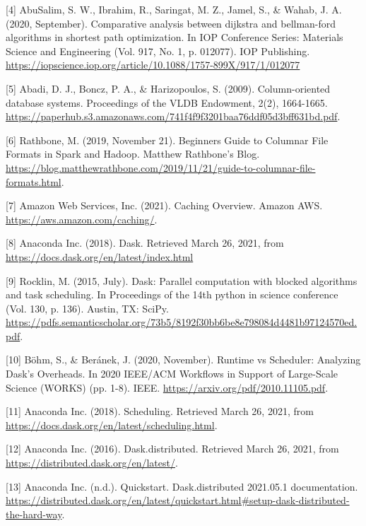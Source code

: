 \documentclass[11pt, oneside]{book}
\begin{document}
\begin{thebibliography}{111}
[4] AbuSalim, S. W., Ibrahim, R., Saringat, M. Z., Jamel, S., \& Wahab, J. A. (2020, September). Comparative analysis between dijkstra and bellman-ford algorithms in shortest path optimization. In IOP Conference Series: Materials Science and Engineering (Vol. 917, No. 1, p. 012077). IOP Publishing. \url{https://iopscience.iop.org/article/10.1088/1757-899X/917/1/012077}

[5] Abadi, D. J., Boncz, P. A., \& Harizopoulos, S. (2009). Column-oriented database systems. Proceedings of the VLDB Endowment, 2(2), 1664-1665. \url{https://paperhub.s3.amazonaws.com/741f4f9f3201baa76ddf05d3bff631bd.pdf}.

[6] Rathbone, M. (2019, November 21). Beginners Guide to Columnar File Formats in Spark and Hadoop. Matthew Rathbone's Blog. \url{https://blog.matthewrathbone.com/2019/11/21/guide-to-columnar-file-formats.html}.

[7] Amazon Web Services, Inc. (2021). Caching Overview. Amazon AWS. \url{https://aws.amazon.com/caching/}. 

[8] Anaconda Inc. (2018). Dask. Retrieved March 26, 2021, from \url{https://docs.dask.org/en/latest/index.html}

[9] Rocklin, M. (2015, July). Dask: Parallel computation with blocked algorithms and task scheduling. In Proceedings of the 14th python in science conference (Vol. 130, p. 136). Austin, TX: SciPy. \url{https://pdfs.semanticscholar.org/73b5/8192f30bb6be8e798084d4481b97124570ed.pdf}.

[10] Böhm, S., \& Beránek, J. (2020, November). Runtime vs Scheduler: Analyzing Dask’s Overheads. In 2020 IEEE/ACM Workflows in Support of Large-Scale Science (WORKS) (pp. 1-8). IEEE. \url{https://arxiv.org/pdf/2010.11105.pdf}.

[11] Anaconda Inc. (2018). Scheduling. Retrieved March 26, 2021, from \url{https://docs.dask.org/en/latest/scheduling.html}.

[12] Anaconda Inc. (2016). Dask.distributed. Retrieved March 26, 2021, from \url{https://distributed.dask.org/en/latest/}.

[13] Anaconda Inc. (n.d.). Quickstart. Dask.distributed 2021.05.1 documentation. \url{https://distributed.dask.org/en/latest/quickstart.html#setup-dask-distributed-the-hard-way}. 


\end{thebibliography}
\end{document}

